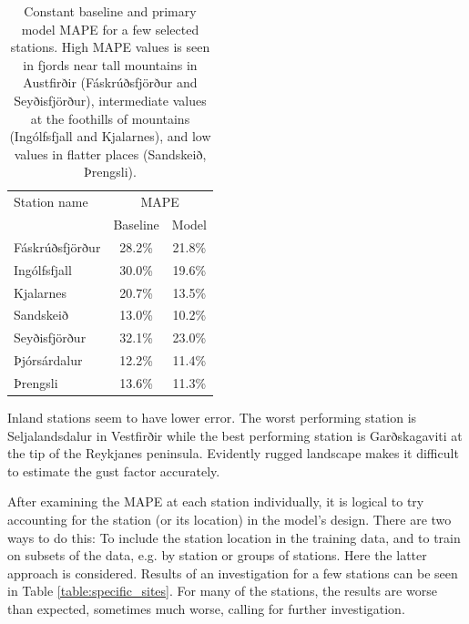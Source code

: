 \begin{table}[H]
    \caption[Primary model MAPE by selected stations]{Constant baseline and primary model MAPE for a few selected stations. High MAPE values is seen in fjords near tall mountains in Austfirðir (Fáskrúðsfjörður and Seyðisfjörður), intermediate values at the foothills of mountains (Ingólfsfjall and Kjalarnes), and low values in flatter places (Sandskeið, Þrengsli).}
    \label{table:more_specific_sites}
    \centering
    \begin{tabular}{lcc}
        \toprule
        Station name & \multicolumn{2}{c}{MAPE}\\
         & Baseline & Model\\
        \midrule
        Fáskrúðsfjörður & 28.2\% & 21.8\%\\
        Ingólfsfjall & 30.0\% & 19.6\%\\
        Kjalarnes & 20.7\% & 13.5\% \\
        Sandskeið & 13.0\% & 10.2\%\\
        Seyðisfjörður & 32.1\% & 23.0\%\\
        Þjórsárdalur & 12.2\% & 11.4\%\\
        Þrengsli & 13.6\% & 11.3\%\\
        \bottomrule
    \end{tabular}
\end{table}

Inland stations seem to have lower error. The worst performing station is Seljalandsdalur in Vestfirðir while the best performing station is Garðskagaviti at the tip of the Reykjanes peninsula. Evidently rugged landscape makes it difficult to estimate the gust factor accurately.

After examining the MAPE at each station individually, it is logical to try accounting for the station (or its location) in the model’s design. There are two ways to do this: To include the station location in the training data, and to train on subsets of the data, e.g. by station or groups of stations. Here the latter approach is considered. Results of an investigation for a few stations can be seen in Table \ref{table:specific_sites}. For many of the stations, the results are worse than expected, sometimes much worse, calling for further investigation.

